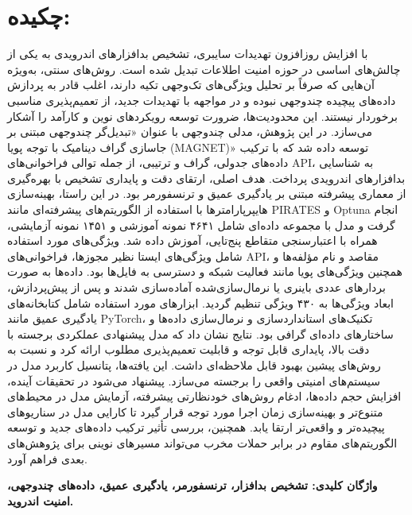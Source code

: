 \chapter*{\vspace{-2.38cm}\fontsize{15}{16}\selectfont چکیده:}
\vspace{-1.5cm}\setlength{\parindent}{20pt}
با افزایش روزافزون تهدیدات سایبری، تشخیص بدافزارهای اندرویدی به یکی از چالش‌های اساسی در حوزه امنیت اطلاعات تبدیل شده است. روش‌های سنتی، به‌ویژه آن‌هایی که صرفاً بر تحلیل ویژگی‌های تک‌وجهی تکیه دارند، اغلب قادر به پردازش داده‌های پیچیده چندوجهی نبوده و در مواجهه با تهدیدات جدید، از تعمیم‌پذیری مناسبی برخوردار نیستند. این محدودیت‌ها، ضرورت توسعه رویکردهای نوین و کارآمد را آشکار می‌سازد. در این پژوهش، مدلی چندوجهی با عنوان «تبدیل‌گر چندوجهی مبتنی بر جاسازی گراف دینامیک با توجه پویا (MAGNET)» توسعه داده شد که با ترکیب داده‌های جدولی، گراف و ترتیبی، از جمله توالی فراخوانی‌های API، به شناسایی بدافزارهای اندرویدی پرداخت. هدف اصلی، ارتقای دقت و پایداری تشخیص با بهره‌گیری از معماری پیشرفته مبتنی بر یادگیری عمیق و ترنسفورمر بود. در این راستا، بهینه‌سازی هایپرپارامترها با استفاده از الگوریتم‌های پیشرفته‌ای مانند PIRATES و Optuna انجام گرفت و مدل با مجموعه داده‌ای شامل ۴۶۴۱ نمونه آموزشی و ۱۴۵۱ نمونه آزمایشی، همراه با اعتبارسنجی متقاطع پنج‌تایی، آموزش داده شد. ویژگی‌های مورد استفاده شامل ویژگی‌های ایستا نظیر مجوزها، فراخوانی‌های API، مقاصد و نام مؤلفه‌ها و همچنین ویژگی‌های پویا مانند فعالیت شبکه و دسترسی به فایل‌ها بود. داده‌ها به صورت بردارهای عددی باینری یا نرمال‌سازی‌شده آماده‌سازی شدند و پس از پیش‌پردازش، ابعاد ویژگی‌ها به ۴۳۰ ویژگی تنظیم گردید. ابزارهای مورد استفاده شامل کتابخانه‌های یادگیری عمیق مانند PyTorch، تکنیک‌های استانداردسازی و نرمال‌سازی داده‌ها و ساختارهای داده‌ای گرافی بود. نتایج نشان داد که مدل پیشنهادی عملکردی برجسته با دقت بالا، پایداری قابل توجه و قابلیت تعمیم‌پذیری مطلوب ارائه کرد و نسبت به روش‌های پیشین بهبود قابل ملاحظه‌ای داشت. این یافته‌ها، پتانسیل کاربرد مدل در سیستم‌های امنیتی واقعی را برجسته می‌سازد. پیشنهاد می‌شود در تحقیقات آینده، افزایش حجم داده‌ها، ادغام روش‌های خودنظارتی پیشرفته، آزمایش مدل در محیط‌های متنوع‌تر و بهینه‌سازی زمان اجرا مورد توجه قرار گیرد تا کارایی مدل در سناریوهای پیچیده‌تر و واقعی‌تر ارتقا یابد. همچنین، بررسی تأثیر ترکیب داده‌های جدید و توسعه الگوریتم‌های مقاوم در برابر حملات مخرب می‌تواند مسیرهای نوینی برای پژوهش‌های بعدی فراهم آورد.

\par\vspace{.5cm}\setlength{\parindent}{0pt}
{\bf
واژگان کلیدی: تشخیص بدافزار، ترنسفورمر، یادگیری عمیق، داده‌های چندوجهی، امنیت اندروید.

} 

 
